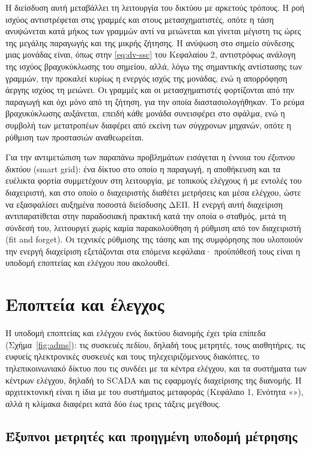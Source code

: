 Η διείσδυση αυτή μεταβάλλει τη λειτουργία του δικτύου με αρκετούς τρόπους. Η ροή ισχύος
αντιστρέφεται στις γραμμές και στους μετασχηματιστές, οπότε η τάση ανυψώνεται κατά μήκος των
γραμμών αντί να μειώνεται και γίνεται μέγιστη τις ώρες της μεγάλης παραγωγής και
της μικρής ζήτησης. Η ανύψωση στο σημείο σύνδεσης μιας μονάδας είναι, όπως στην
\eqref{eq:dv-ssc} του Κεφαλαίου 2, αντιστρόφως ανάλογη της ισχύος βραχυκύκλωσης του σημείου,
αλλά, λόγω της σημαντικής αντίστασης των γραμμών, την προκαλεί κυρίως η ενεργός ισχύς της
μονάδας, ενώ η απορρόφηση άεργης ισχύος τη μειώνει. Οι γραμμές και οι μετασχηματιστές
φορτίζονται από την παραγωγή και όχι μόνο από τη ζήτηση, για την οποία διαστασιολογήθηκαν. Το
ρεύμα βραχυκύκλωσης αυξάνεται, επειδή κάθε μονάδα συνεισφέρει στο σφάλμα, ενώ η συμβολή των
μετατροπέων διαφέρει από εκείνη των σύγχρονων μηχανών, οπότε η ρύθμιση των προστασιών
αναθεωρείται.

Για την αντιμετώπιση των παραπάνω προβλημάτων εισάγεται η έννοια του \emph{έξυπνου δικτύου}
(smart grid): ένα δίκτυο στο οποίο η παραγωγή, η αποθήκευση και τα ευέλικτα φορτία
συμμετέχουν στη λειτουργία, με τοπικούς ελέγχους ή με εντολές του διαχειριστή, και στο οποίο ο
διαχειριστής διαθέτει μετρήσεις και μέσα ελέγχου, ώστε να εξασφαλίσει αυξημένα ποσοστά
διείσδυσης ΔΕΠ. Η ενεργή αυτή διαχείριση αντιπαρατίθεται στην παραδοσιακή πρακτική κατά την
οποία ο σταθμός, μετά τη σύνδεσή του, λειτουργεί χωρίς καμία παρακολούθηση ή ρύθμιση από τον
διαχειριστή (fit and forget). Οι τεχνικές ρύθμισης της τάσης και της συμφόρησης που υλοποιούν
την ενεργή διαχείριση εξετάζονται στα επόμενα κεφάλαια· προϋπόθεσή τους είναι η υποδομή
εποπτείας και ελέγχου που ακολουθεί.

\section{Εποπτεία και έλεγχος}
\label{sec:dn-control}

Η υποδομή εποπτείας και ελέγχου ενός δικτύου διανομής έχει τρία επίπεδα (Σχήμα~\ref{fig:adms}):
τις συσκευές πεδίου, δηλαδή τους μετρητές, τους αισθητήρες, τις ευφυείς ηλεκτρονικές
συσκευές και τους τηλεχειριζόμενους διακόπτες, το τηλεπικοινωνιακό δίκτυο που τις συνδέει με
τα κέντρα ελέγχου, και τα συστήματα των κέντρων ελέγχου, δηλαδή το SCADA και τις εφαρμογές
διαχείρισης της διανομής. Η αρχιτεκτονική είναι η ίδια με του συστήματος μεταφοράς
(Κεφάλαιο 1, Ενότητα «»), αλλά η κλίμακα διαφέρει κατά δύο έως τρεις
τάξεις μεγέθους.

\subsection{Έξυπνοι μετρητές και προηγμένη υποδομή μέτρησης}
\label{sec:smart-meters}


